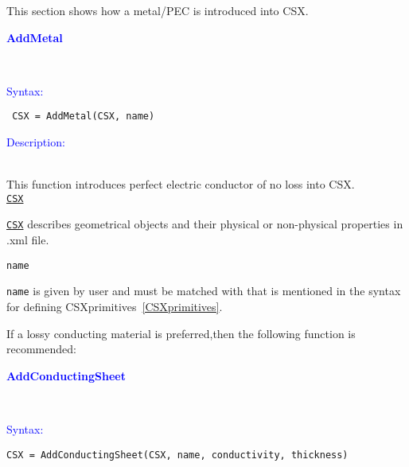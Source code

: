 This section shows how a metal/PEC is introduced into CSX. 

\textcolor{blue}{\begin{large}\textbf{AddMetal}\end{large}}\\
\textcolor{blue}{\begin{large}Syntax:\end{large}}

  \begin{lstlisting}
 CSX = AddMetal(CSX, name)
  \end{lstlisting}
  
\textcolor{blue}{\begin{large}Description:\end{large}}\\
This function introduces perfect electric conductor of no loss into CSX.\\
\hyperref[para:CSX]{\texttt{CSX}} 
 \begin{myindentpar}\hyperref[para:CSX]{\texttt{CSX}} describes geometrical objects and their physical or non-physical properties in .xml file.
 \end{myindentpar} 
 \texttt{name} 
 \begin{myindentpar}{\texttt{name}} is given by user and must be matched with that is mentioned in the syntax for defining CSXprimitives~\ref{CSXprimitives}.  
 \end{myindentpar} 

 If a lossy conducting material is preferred,then the following function is recommended:  
 
\textcolor{blue}{\begin{large}\textbf{AddConductingSheet}\end{large}}\\

\textcolor{blue}{\begin{large}Syntax:\end{large}}

  \begin{lstlisting}
CSX = AddConductingSheet(CSX, name, conductivity, thickness)
  \end{lstlisting}
  
